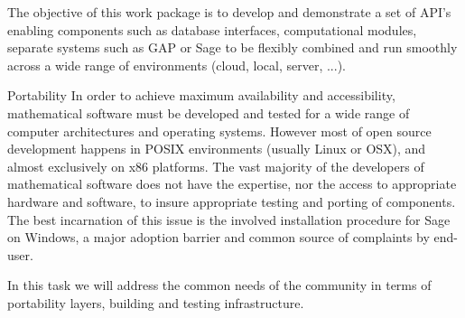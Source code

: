 \addtocounter{wpno}{1}
\begin{Workpackage}{\thewpno}
  \WPTitle{\wpname{\thewpno}}

  \begin{WPObjectives}
    The objective of this work package is to develop and demonstrate a
    set of API's enabling components such as database interfaces,
    computational modules, separate systems such as GAP or Sage to be
    flexibly combined and run smoothly across a wide range of
    environments (cloud, local, server, ...).
  \end{WPObjectives}

  \begin{WPDescription}
  \end{WPDescription}


  \begin{task}{Portability}
    In order to achieve maximum availability and accessibility,
    mathematical software must be developed and tested for a wide range
    of computer architectures and operating systems.  However most of
    open source development happens in POSIX environments (usually
    Linux or OSX), and almost exclusively on x86 platforms.  The vast
    majority of the developers of mathematical software does not have
    the expertise, nor the access to appropriate hardware and software, to insure
    appropriate testing and porting of components.  The best
    incarnation of this issue is the involved installation procedure
    for Sage on Windows, a major adoption barrier and common source of
    complaints by end-user.

    In this task we will address the common needs of the community in
    terms of portability layers, building and testing infrastructure.


\end{task}
\end{Workpackage}
